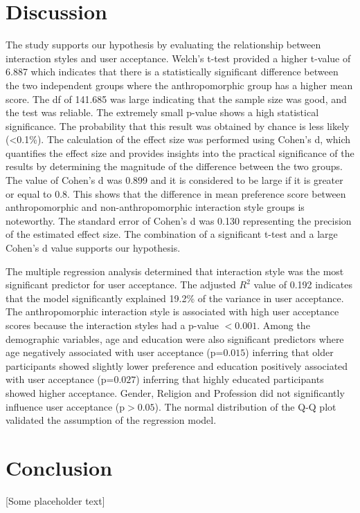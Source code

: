 \documentclass[conference]{IEEEtran}
\begin{document}
  \section{Discussion}
  The study supports our hypothesis by evaluating the relationship between interaction styles and user acceptance. Welch’s t-test provided a higher t-value of 6.887 which indicates that there is a statistically significant difference between the two independent groups where the anthropomorphic group has a higher mean score. The df of 141.685 was large indicating that the sample size was good, and the test was reliable. The extremely small p-value shows a high statistical significance. The probability that this result was obtained by chance is less likely (\textless 0.1\%). The calculation of the effect size was performed using Cohen’s d, which quantifies the effect size and provides insights into the practical significance of the results by determining the magnitude of the difference between the two groups. The value of Cohen’s d was 0.899 and it is considered to be large if it is greater or equal to 0.8. This shows that the difference in mean preference score between anthropomorphic and non-anthropomorphic interaction style groups is noteworthy. The standard error of Cohen’s d was 0.130 representing the precision of the estimated effect size. The combination of a significant t-test and a large Cohen’s d value supports our hypothesis. \par
  The multiple regression analysis determined that interaction style was the most significant predictor for user acceptance. The adjusted $R^2$ value of 0.192 indicates that the model significantly explained 19.2\% of the variance in user acceptance. The anthropomorphic interaction style is associated with high user acceptance scores because the interaction styles had a p-value $< 0.001$. Among the demographic variables, age and education were also significant predictors where age negatively associated with user acceptance (p=$0.015$) inferring that older participants showed slightly lower preference and education positively associated with user acceptance (p=$0.027$) inferring that highly educated participants showed higher acceptance. Gender, Religion and Profession did not significantly influence user acceptance (p$>0.05$). The normal distribution of the Q-Q plot validated the assumption of the regression model.      
  

\section{Conclusion}
 [Some placeholder text]
\end{document}
